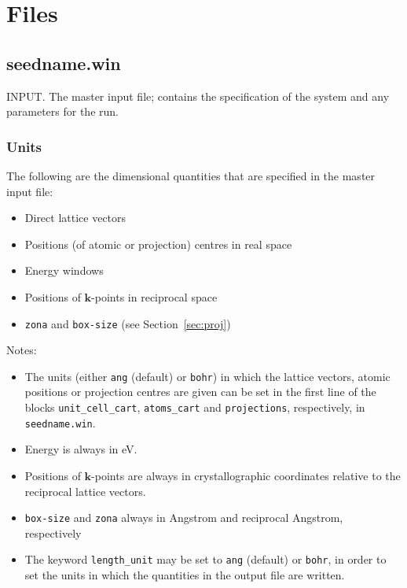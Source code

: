 \chapter{Files}


\section{seedname.win}
INPUT. The master input file; contains the specification of the system
and any parameters for the run. 

\subsection{Units}

The following are the dimensional quantities that are
specified in the master input file:

\begin{itemize}
\item Direct lattice vectors
\item Positions (of atomic or projection) centres in real space
\item Energy windows
\item Positions of $\mathbf{k}$-points in reciprocal space
\item \verb#zona# and \verb#box-size# (see Section~\ref{sec:proj})
\end{itemize}

Notes:

\begin{itemize}
\item The units (either \verb#ang#
  (default) or \verb#bohr#) in which the lattice vectors, atomic
  positions or projection centres are given can be set in the first
  line of the blocks 
  \verb#unit_cell_cart#, \verb#atoms_cart# and \verb#projections#,
  respectively, in \verb#seedname.win#.
\item Energy is always in eV.
\item Positions of $\mathbf{k}$-points are always in crystallographic
  coordinates relative to the reciprocal lattice vectors.
\item \verb#box-size# and \verb#zona# always in Angstrom and
  reciprocal Angstrom, respectively
\item The keyword \verb#length_unit# may be set to \verb#ang#
  (default) or \verb#bohr#, in order to set the units in which the
  quantities in the output file are written.
\end{itemize}

